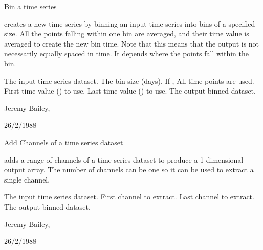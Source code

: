 \begin{manroutinedescription}
        Bin a time series

        {} creates a new time series by binning an input time series
        into bins of a specified size. All the points falling within
        one bin are averaged, and their time value is averaged to create
        the new bin time. Note that this means that the output is not
        necessarily equally spaced in time. It depends where the points
        fall within the bin.

\begin{manparametertable}
  The input %
time series dataset.
   The bin size (days).
  If {}, All time %
points are used.
   First time value ({}) to use.
   Last time value ({}) %
to use.
  The %
output binned dataset.

\end{manparametertable}
         Jeremy Bailey, {}

         26/2/1988

\end{manroutinedescription}
\begin{manroutinedescription}
        Add Channels of a time series dataset

        {} adds a range of channels of a time series dataset
        to produce a 1-dimensional output array. The number of channels
        can be one so it can be used to extract a single channel.

\begin{manparametertable}
  The input %
time series dataset.
  First channel to extract.
  Last channel to extract.
  The %
output binned dataset.

\end{manparametertable}
         Jeremy Bailey, {}

         26/2/1988

\end{manroutinedescription}
